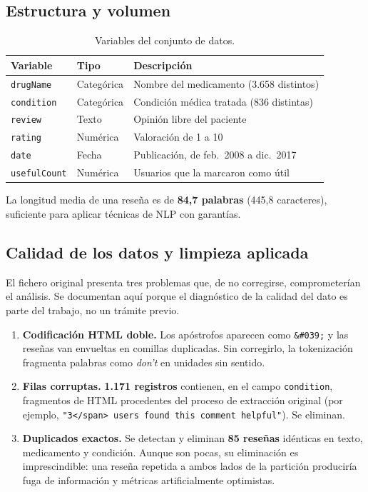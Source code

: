 \documentclass[11pt,a4paper]{article}
\begin{document}
\subsection{Estructura y volumen}

\begin{table}[htbp]\centering\small
\caption{Variables del conjunto de datos.}
\begin{tabular}{@{}lll@{}}
\toprule
\textbf{Variable} & \textbf{Tipo} & \textbf{Descripción} \\ \midrule
\texttt{drugName}    & Categórica & Nombre del medicamento (3.658 distintos) \\
\texttt{condition}   & Categórica & Condición médica tratada (836 distintas) \\
\texttt{review}      & Texto      & Opinión libre del paciente \\
\texttt{rating}      & Numérica   & Valoración de 1 a 10 \\
\texttt{date}        & Fecha      & Publicación, de feb.~2008 a dic.~2017 \\
\texttt{usefulCount} & Numérica   & Usuarios que la marcaron como útil \\ \bottomrule
\end{tabular}
\end{table}

La longitud media de una reseña es de \textbf{84,7 palabras} (445,8 caracteres),
suficiente para aplicar técnicas de NLP con garantías.

\subsection{Calidad de los datos y limpieza aplicada}

El fichero original presenta tres problemas que, de no corregirse,
comprometerían el análisis. Se documentan aquí porque el diagnóstico de la
calidad del dato es parte del trabajo, no un trámite previo.

\begin{enumerate}[leftmargin=*]
  \item \textbf{Codificación HTML doble.} Los apóstrofos aparecen como
        \texttt{\&\#039;} y las reseñas van envueltas en comillas duplicadas.
        Sin corregirlo, la tokenización fragmenta palabras como
        \textit{don't} en unidades sin sentido.
  \item \textbf{Filas corruptas.} \textbf{1.171 registros} contienen, en el
        campo \texttt{condition}, fragmentos de HTML procedentes del proceso
        de extracción original (por ejemplo,
        \texttt{"3</span> users found this comment helpful"}). Se eliminan.
  \item \textbf{Duplicados exactos.} Se detectan y eliminan \textbf{85 reseñas}
        idénticas en texto, medicamento y condición. Aunque son pocas, su
        eliminación es imprescindible: una reseña repetida a ambos lados de la
        partición produciría fuga de información y métricas artificialmente
        optimistas.
\end{enumerate}
\end{document}
